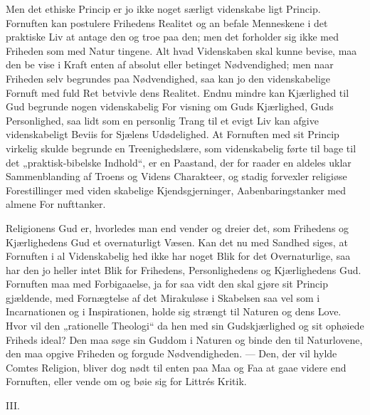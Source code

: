 \documentclass[12pt,a4paper]{article}
\newcommand{\opage}[1]{\marginnote{\footnotesize\textit{[#1]}}}
\begin{document}
Men det ethiske Princip er jo ikke noget særligt videnskabe\-%
ligt Princip. Fornuften kan postulere Frihedens Realitet og an\-%
befale Menneskene i det praktiske Liv at antage den og troe paa
den; men det forholder sig ikke med Friheden som med Natur\-%
tingene. Alt hvad Videnskaben skal kunne bevise, maa den be\-%
vise i Kraft enten af absolut eller betinget Nødvendighed; men
\opage{33}naar Friheden selv begrundes paa Nødvendighed, saa kan jo den
videnskabelige Fornuft med fuld Ret betvivle dens Realitet. Endnu
mindre kan Kjærlighed til Gud begrunde nogen videnskabelig For\-%
visning om Guds Kjærlighed, Guds Personlighed, saa lidt som en
personlig Trang til et evigt Liv kan afgive videnskabeligt Beviis
for Sjælens Udødelighed. At Fornuften med sit Princip virkelig
skulde begrunde en Treenighedslære, som videnskabelig førte til\-%
bage til det „praktisk-bibelske Indhold“, er en Paastand, der for\-%
raader en aldeles uklar Sammenblanding af Troens og Videns
Charakteer, og stadig forvexler religiøse Forestillinger med viden\-%
skabelige Kjendsgjerninger, Aabenbaringstanker med almene For\-%
nufttanker.

Religionens Gud er, hvorledes man end vender og dreier det,
som Frihedens og Kjærlighedens Gud et overnaturligt Væsen.
Kan det nu med Sandhed siges, at Fornuften i al Videnskabelig\-%
hed ikke har noget Blik for det Overnaturlige, saa har den jo
heller intet Blik for Frihedens, Personlighedens og Kjærlighedens
Gud. Fornuften maa med Forbigaaelse, ja for saa vidt den skal
gjøre sit Princip gjældende, med Fornægtelse af det Mirakuløse
i Skabelsen saa vel som i Incarnationen og i Inspirationen, holde
sig strængt til Naturen og dens Love. Hvor vil den „rationelle
Theologi“ da hen med sin Gudskjærlighed og sit ophøiede Friheds\-%
ideal? Den maa søge sin Guddom i Naturen og binde den til
Naturlovene, den maa opgive Friheden og forgude Nødvendigheden.
--- Den, der vil hylde Comtes Religion, bliver dog nødt til enten paa
Maa og Faa at gaae videre end Fornuften, eller vende om og
bøie sig for Littrés Kritik.

\begin{center}III.\end{center}
\end{document}

